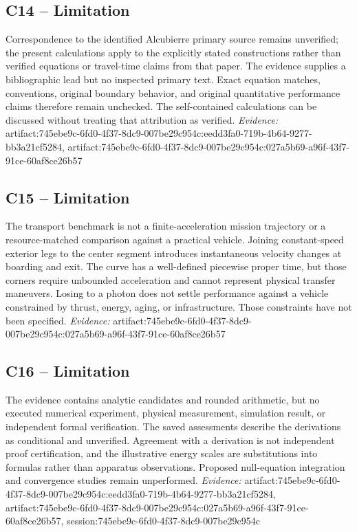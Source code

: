 \documentclass[11pt]{article}
\begin{document}
\subsection{C14 -- Limitation}
Correspondence to the identified Alcubierre primary source remains unverified; the present calculations apply to the explicitly stated constructions rather than verified equations or travel-time claims from that paper.
The evidence supplies a bibliographic lead but no inspected primary text. Exact equation matches, conventions, original boundary behavior, and original quantitative performance claims therefore remain unchecked. The self-contained calculations can be discussed without treating that attribution as verified.
\textit{Evidence: }artifact:745ebe9c-6fd0-4f37-8dc9-007be29c954c:eedd3fa0-719b-4b64-9277-bb3a21cf5284, artifact:745ebe9c-6fd0-4f37-8dc9-007be29c954c:027a5b69-a96f-43f7-91ce-60af8ce26b57
\subsection{C15 -- Limitation}
The transport benchmark is not a finite-acceleration mission trajectory or a resource-matched comparison against a practical vehicle.
Joining constant-speed exterior legs to the center segment introduces instantaneous velocity changes at boarding and exit. The curve has a well-defined piecewise proper time, but those corners require unbounded acceleration and cannot represent physical transfer maneuvers. Losing to a photon does not settle performance against a vehicle constrained by thrust, energy, aging, or infrastructure. Those constraints have not been specified.
\textit{Evidence: }artifact:745ebe9c-6fd0-4f37-8dc9-007be29c954c:027a5b69-a96f-43f7-91ce-60af8ce26b57
\subsection{C16 -- Limitation}
The evidence contains analytic candidates and rounded arithmetic, but no executed numerical experiment, physical measurement, simulation result, or independent formal verification.
The saved assessments describe the derivations as conditional and unverified. Agreement with a derivation is not independent proof certification, and the illustrative energy scales are substitutions into formulas rather than apparatus observations. Proposed null-equation integration and convergence studies remain unperformed.
\textit{Evidence: }artifact:745ebe9c-6fd0-4f37-8dc9-007be29c954c:eedd3fa0-719b-4b64-9277-bb3a21cf5284, artifact:745ebe9c-6fd0-4f37-8dc9-007be29c954c:027a5b69-a96f-43f7-91ce-60af8ce26b57, session:745ebe9c-6fd0-4f37-8dc9-007be29c954c
\end{document}
